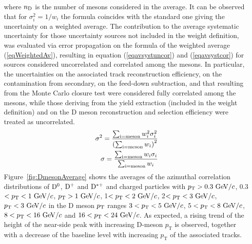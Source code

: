 where $n_{\rm D}$ is the number of mesons considered in the average.
It can be observed that for $\sigma^{2}_{i}=1/w_{i}$ the formula coincides with the standard one giving the uncertainty on a weighted average.
The contribution to the average systematic uncertainty for those uncertainty sources not included in the weight definition, was evaluated via error propagation on the formula of the weighted average (\ref{eqWeightedAv}), resulting in equation (\ref{eqavsystuncor}) and (\ref{eqavsystcor}) for sources
considered uncorrelated and correlated among the mesons. In particular, the uncertainties on the associated track reconstruction efficiency, on the
contamination from secondary, on the feed-down subtraction, and that resulting from the Monte Carlo closure test were considered fully correlated among
the mesons, while those deriving from the yield extraction (included in the weight definition) and on the D meson reconstruction and selection efficiency were treated as uncorrelated.
\begin{eqnarray}
  \sigma^{2}=\frac{\sum_{\rm i=meson}w_{i}^{2}\sigma^{2}_{i}}{\left( \sum_{\rm i=meson}w_{i}\right)^{2}}  \label{eqavsystuncor}\\
  \sigma=\frac{\sum_{\rm i=meson}w_{i}\sigma_{i}}{ \sum_{\rm i=meson}w_{i}}   \label{eqavsystcor}
\end{eqnarray}
Figure~\ref{fig:DmesonAverage} shows the averages of the azimuthal correlation distributions of ${\rm D^0}$, ${\rm D^+}$ and ${\rm D^{*+}}$ and charged particles with $p_{\rm T}>0.3~\mathrm{GeV}/c$, 0.3$<p_{\rm T}<1~\mathrm{GeV}/c$, $p_{\rm T}>1~\mathrm{GeV}/c$, 1$<p_{\rm T}<2~\mathrm{GeV}/c$, 2$<p_{\rm T}<3~\mathrm{GeV}/c$, $p_{\rm T}<3~\mathrm{GeV}/c$ in the D meson $p_{\rm T}$ ranges $3<p_{\rm T}<5~\mathrm{GeV}/c$, $5<p_{\rm T}<8~\mathrm{GeV}/c$, $8<p_{\rm T}<16~\mathrm{GeV}/c$ and $16<p_{\rm T}<24~\mathrm{GeV}/c$.
As expected, a rising trend of the height of the near-side peak with increasing D-meson $p_\mathrm{T}$ is observed, together with a decrease of the baseline level with increasing $p_\mathrm{T}$ of the associated tracks.
\clearpage

